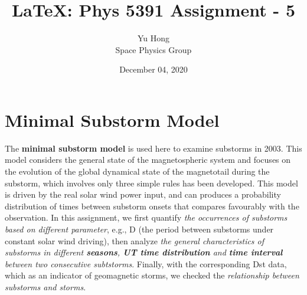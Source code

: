 \documentclass[12pt, letterpaper]{article} %
\begin{document}
\title{\LaTeX: Phys 5391 Assignment - 5} %
\author{Yu Hong\\Space Physics Group} %
\date{December 04, 2020}  %
\maketitle %
\linenumbers %



\section{Minimal Substorm Model} %

The \textbf{minimal substorm model } is used here to examine substorms in 2003. This model considers the general state of the magnetospheric system and focuses on the evolution of the global dynamical state of the magnetotail during the substorm, which involves only three simple rules has been developed. This model is driven by the real solar wind power input, and can produces a probability distribution of times between substorm onsets that compares favourably with the observation. In this assignment, we first quantify \emph{the occurrences of substorms based on different parameter}, e.g., D (the period between substorms under constant solar wind driving), then analyze \emph{the general characteristics of substorms in different \textbf{seasons}, \textbf{UT time distribution} and \textbf{time interval} between two consecutive subtstorms}. Finally, with the corresponding Dst data, which as an indicator of geomagnetic storms, we checked the \emph{relationship between substorms and storms}. 


\end{document}
